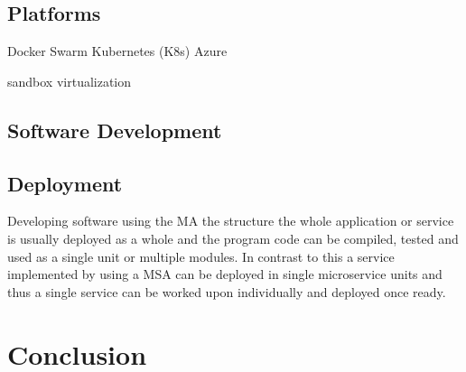     \subsection{Platforms}
        \begin{sloppypar}

        \end{sloppypar}
    
    Docker Swarm
    Kubernetes (K8s)
    Azure

    sandbox
    virtualization 

    \subsection{Software Development}
    \subsection{Deployment}
        \begin{sloppypar}

            Developing software using the MA the structure the whole application or service 
            is usually deployed as a whole and the program code can be compiled, tested and
            used as a single unit or multiple modules. In contrast to this a service implemented 
            by using a MSA can be deployed in single microservice units and thus a single service 
            can be worked upon individually and deployed once ready.
        
        \end{sloppypar}







\section{Conclusion}


